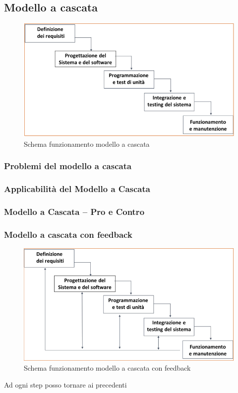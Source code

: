 \documentclass{article}
\begin{document}
	\subsection{Modello a cascata}
	\begin{figure}[h]
		\centering
		\includegraphics[scale=0.3]{4.mod_cascata.png}
		\caption{Schema funzionamento modello a cascata}
		\label{fig:im-4}
	\end{figure}
		\subsubsection{Problemi del modello a cascata}
	\subsubsection{Applicabilità del Modello a Cascata}
	\subsubsection{Modello a Cascata – Pro e Contro}
	\subsubsection{Modello a cascata con feedback}
	\begin{figure}[h]
	\centering
	\includegraphics[scale=0.3]{5.mod_cascata_fb.png}
	\caption{Schema funzionamento modello a cascata con feedback}
	\label{fig:im-5}
	\end{figure}
	Ad ogni step posso tornare ai precedenti
\end{document}
